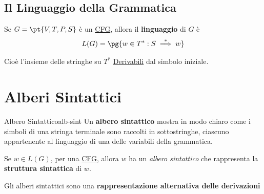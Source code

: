 \subsection{Il Linguaggio della Grammatica}\label{sub:ll_il_linguaggio_della_grammatica} %
Se $G=\pt{V,T,P,S}$ è un \hyperref[def:cfg]{CFG}, allora il \textbf{linguaggio} di $G$ è
\[
    L(G) = \pg{w\in T^*:S \overset{*}{\implies}w}
\]
\begin{note}
    Cioè l'insieme delle stringhe su $T^*$ \hyperref[rem:gram-derivazione]{Derivabili} dal simbolo iniziale.
\end{note}
%
\section{Alberi Sintattici}\label{sec:ll_alberi_sintattici} %
\begin{definition}{Albero Sintattico}{alb-sint}
    Un \textbf{albero sintattico} mostra in modo chiaro come i simboli di una stringa terminale sono raccolti in sottostringhe, ciascuno appartenente al linguaggio di una delle variabili della grammatica.
    \begin{note}
        Se $w \in L(G)$, per una \hyperref[def:cfg]{CFG}, allora $w$ ha un \textit{albero sintattico} che rappresenta la \textbf{struttura sintattica} di $w$.
        \begin{tip}
            Gli alberi sintattici sono una \textbf{rappresentazione alternativa delle derivazioni}
        \end{tip}
    \end{note}
    \begin{critical}
    \end{critical}
\end{definition}
%
